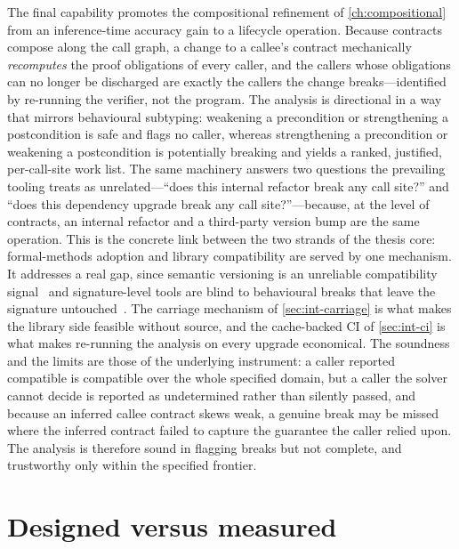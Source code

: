 The final capability promotes the compositional refinement of
\cref{ch:compositional} from an inference-time accuracy gain to a lifecycle
operation. Because contracts compose along the call graph, a change to a callee's
contract mechanically \emph{recomputes} the proof obligations of every caller, and
the callers whose obligations can no longer be discharged are exactly the callers
the change breaks---identified by re-running the verifier, not the program. The
analysis is directional in a way that mirrors behavioural subtyping: weakening a
precondition or strengthening a postcondition is safe and flags no caller, whereas
strengthening a precondition or weakening a postcondition is potentially breaking
and yields a ranked, justified, per-call-site work list. The same machinery
answers two questions the prevailing tooling treats as unrelated---``does this
internal refactor break any call site?'' and ``does this dependency upgrade break
any call site?''---because, at the level of contracts, an internal refactor and a
third-party version bump are the same operation. This is the concrete link between
the two strands of the thesis core: formal-methods adoption and library
compatibility are served by one mechanism. It addresses a real gap, since semantic
versioning is an unreliable compatibility signal~\citep{preston2013semver,
raemaekers2017semver} and signature-level tools are blind to behavioural breaks
that leave the signature untouched~\citep{mostafa2017behavioral}. The carriage
mechanism of \cref{sec:int-carriage} is what makes the library side feasible
without source, and the cache-backed CI of \cref{sec:int-ci} is what makes
re-running the analysis on every upgrade economical. The soundness and the limits
are those of the underlying instrument: a caller reported compatible is compatible
over the whole specified domain, but a caller the solver cannot decide is reported
as undetermined rather than silently passed, and because an inferred callee
contract skews weak, a genuine break may be missed where the inferred contract
failed to capture the guarantee the caller relied upon. The analysis is therefore
sound in flagging breaks but not complete, and trustworthy only within the
specified frontier.

\section{Designed versus measured}\label{sec:int-disclaimer}

